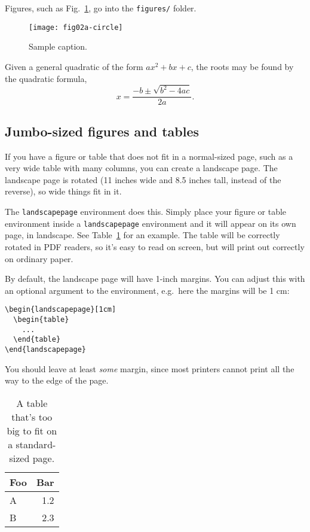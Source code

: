 \documentclass[draft]{cmustatproposal} %
\begin{document}
Figures, such as Fig.~\ref{label}, go into the \texttt{figures/} folder.

\begin{figure}
  \centering
  \texttt{[image: fig02a-circle]}
  \caption{Sample caption.}
  \label{label}
\end{figure}

Given a general quadratic of the form $ax^2 + bx + c$, the roots may be found by
the quadratic formula,
\[
  x = \frac{-b \pm \sqrt{b^2 - 4ac}}{2a}.
\]

\subsection{Jumbo-sized figures and tables}

If you have a figure or table that does not fit in a normal-sized page, such as
a very wide table with many columns, you can create a landscape page. The
landscape page is rotated (11 inches wide and 8.5 inches tall, instead of the
reverse), so wide things fit in it.

The \verb|landscapepage| environment does this. Simply place your figure or
table environment inside a \verb|landscapepage| environment and it will appear
on its own page, in landscape. See Table~\ref{jumbo-table} for an example. The
table will be correctly rotated in PDF readers, so it's easy to read on screen,
but will print out correctly on ordinary paper.

By default, the landscape page will have 1-inch margins. You can adjust this
with an optional argument to the environment, e.g.\ here the margins will be 1
cm:
\begin{verbatim}
\begin{landscapepage}[1cm]
  \begin{table}
    ...
  \end{table}
\end{landscapepage}
\end{verbatim}
You should leave at least \emph{some} margin, since most printers cannot print
all the way to the edge of the page.

\begin{landscapepage}
  \begin{table}
    \centering
    \begin{tabular}{l r}\toprule
      Foo & Bar \\\midrule
      A & 1.2\\
      B & 2.3\\\bottomrule
    \end{tabular}
    \caption[Demonstration extra-wide table]{A table that's too big to fit on a
      standard-sized page.}
    \label{jumbo-table}
  \end{table}
\end{landscapepage}
\end{document}
